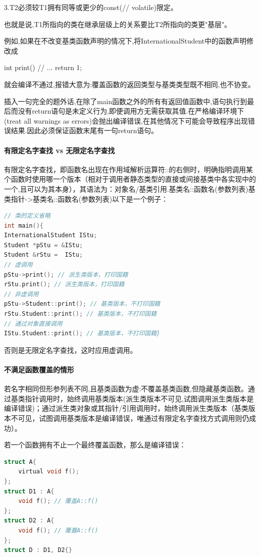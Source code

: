 \documentclass[UTF8]{ctexart}
\begin{document}
3.T2必须较T1拥有同等或更少的const(// volatile)限定。

也就是说,T1所指向的类在继承层级上的关系要比T2所指向的类更"基层"。

例如,如果在不改变基类函数声明的情况下,将InternationalStudent中的函数声明修改成

int print(){    // ...    return 1;}

就会编译不通过,报错大意为:覆盖函数的返回类型与基类类型既不相同,也不协变。

插入一句完全的题外话,在除了main函数之外的所有有返回值函数中,语句执行到最后而没有return语句是未定义行为,即便调用方无需获取其值.在严格编译环境下(treat all warnings as errors)会抛出编译错误,在其他情况下可能会导致程序出现错误结果.因此必须保证函数末尾有一句return语句。

\paragraph{有限定名字查找 vs 无限定名字查找}
有限定名字查找，即函数名出现在作用域解析运算符::的右侧时，明确指明调用某个函数时使用哪一个版本（相对于调用者静态类型的直接或间接基类中各实现中的一个,且可以为其本身），其语法为：对象名/基类引用.基类名::函数名(参数列表)基类指针->基类名::函数名(参数列表)以下是一个例子：

\begin{lstlisting}[language = C,basicstyle=\small\ttfamily]
// 类的定义省略
int main(){   
InternationalStudent IStu;    
Student *pStu = &IStu;    
Student &rStu =  IStu;
// 虚调用    
pStu->print(); // 派生类版本，打印国籍    
rStu.print(); // 派生类版本，打印国籍
// 非虚调用    
pStu->Student::print(); // 基类版本，不打印国籍   
rStu.Student::print(); // 基类版本，不打印国籍
// 通过对象直接调用    
IStu.Student::print(); // 基类版本，不打印国籍}
\end{lstlisting}

否则是无限定名字查找，这时应用虚调用。

\paragraph{不满足函数覆盖的情形}
若名字相同但形参列表不同,且基类函数为虚:不覆盖基类函数,但隐藏基类函数。通过基类指针调用时，始终调用基类版本(派生类版本不可见,试图调用派生类版本是编译错误)；通过派生类对象或其指针/引用调用时，始终调用派生类版本（基类版本不可见，试图调用基类版本是编译错误，唯通过有限定名字查找方式调用则仍成功）。

若一个函数拥有不止一个最终覆盖函数，那么是编译错误：
\begin{lstlisting}[language = C,basicstyle=\small\ttfamily]
struct A{   
    virtual void f();
};
struct D1 : A{    
    void f(); // 覆盖A::f()
};
struct D2 : A{    
    void f(); // 覆蓋A::f()
};
struct D : D1, D2{}
\end{lstlisting}
\end{document}
